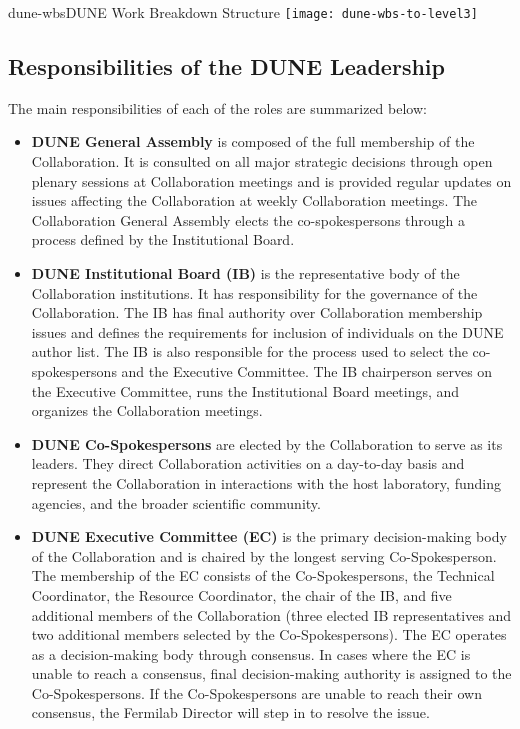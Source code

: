 \begin{cdrfigure}{dune-wbs}{DUNE Work Breakdown Structure}
  \texttt{[image: dune-wbs-to-level3]}
\end{cdrfigure}

\subsection{Responsibilities of the DUNE Leadership}

The main responsibilities of each of the roles are summarized below:
\begin{itemize}
 \item \textbf{DUNE General Assembly} is composed of the full membership of the Collaboration.  It is consulted on all major strategic decisions through open plenary sessions at Collaboration meetings and is provided regular updates on issues affecting the Collaboration at weekly Collaboration meetings.  The Collaboration General Assembly elects the co-spokespersons through a process defined by the Institutional Board.
\item \textbf{DUNE Institutional Board (IB)} is the representative body of the Collaboration institutions. It has responsibility for the governance of the Collaboration. The IB has final authority over Collaboration membership issues and defines the requirements for inclusion of individuals on the DUNE author list. The IB is also responsible for the process used to select the co-spokespersons and the Executive Committee.  The IB chairperson serves on the Executive Committee, runs the Institutional Board meetings, and organizes the Collaboration meetings.
\item \textbf{DUNE Co-Spokespersons} are elected by the Collaboration to serve as its leaders.  They direct Collaboration activities on a day-to-day basis and represent the Collaboration in interactions with the host laboratory, funding agencies, and the broader scientific community.
\item \textbf{DUNE Executive Committee (EC)} is the primary decision-making body of the Collaboration and is chaired by the longest serving Co-Spokesperson.  The membership of the EC consists of the Co-Spokespersons, the Technical Coordinator, the Resource Coordinator, the chair of the IB, and five additional members of the Collaboration (three elected IB representatives and two additional members selected by the Co-Spokespersons).  The EC operates as a decision-making body through consensus.  In cases where the EC is unable to reach a consensus, final decision-making authority is assigned to the Co-Spokespersons.  If the Co-Spokespersons are unable to reach their own consensus, the Fermilab Director will step in to resolve the issue.

\end{itemize}
